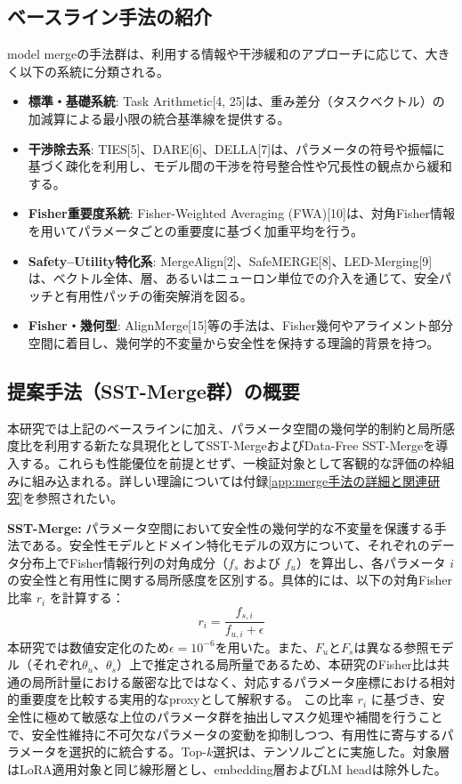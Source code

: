 \documentclass{article}
\begin{document}
\subsection{ベースライン手法の紹介}
model mergeの手法群は、利用する情報や干渉緩和のアプローチに応じて、大きく以下の系統に分類される。

\begin{itemize}
    \item \textbf{標準・基礎系統}: Task Arithmetic[4, 25]は、重み差分（タスクベクトル）の加減算による最小限の統合基準線を提供する。
    \item \textbf{干渉除去系}: TIES[5]、DARE[6]、DELLA[7]は、パラメータの符号や振幅に基づく疎化を利用し、モデル間の干渉を符号整合性や冗長性の観点から緩和する。
    \item \textbf{Fisher重要度系統}: Fisher-Weighted Averaging (FWA)[10]は、対角Fisher情報を用いてパラメータごとの重要度に基づく加重平均を行う。
    \item \textbf{Safety--Utility特化系}: MergeAlign[2]、SafeMERGE[8]、LED-Merging[9]は、ベクトル全体、層、あるいはニューロン単位での介入を通じて、安全パッチと有用性パッチの衝突解消を図る。
    \item \textbf{Fisher・幾何型}: AlignMerge[15]等の手法は、Fisher幾何やアライメント部分空間に着目し、幾何学的不変量から安全性を保持する理論的背景を持つ。
\end{itemize}

\subsection{提案手法（SST-Merge群）の概要}
本研究では上記のベースラインに加え、パラメータ空間の幾何学的制約と局所感度比を利用する新たな具現化としてSST-MergeおよびData-Free SST-Mergeを導入する。これらも性能優位を前提とせず、一検証対象として客観的な評価の枠組みに組み込まれる。詳しい理論については付録\ref{app:merge手法の詳細と関連研究}を参照されたい。

\textbf{SST-Merge:}
パラメータ空間において安全性の幾何学的な不変量を保護する手法である。安全性モデルとドメイン特化モデルの双方について、それぞれのデータ分布上でFisher情報行列の対角成分（$f_s$ および $f_u$）を算出し、各パラメータ $i$ の安全性と有用性に関する局所感度を区別する。具体的には、以下の対角Fisher比率 $r_i$ を計算する：
\[ r_i = \frac{f_{s,i}}{f_{u,i} + \epsilon} \]
本研究では数値安定化のため\(\epsilon=10^{-6}\)を用いた。また、\(F_u\)と\(F_s\)は異なる参照モデル（それぞれ\(\theta_u\)、\(\theta_s\)）上で推定される局所量であるため、本研究のFisher比は共通の局所計量における厳密な比ではなく、対応するパラメータ座標における相対的重要度を比較する実用的なproxyとして解釈する。
この比率 $r_i$ に基づき、安全性に極めて敏感な上位のパラメータ群を抽出しマスク処理や補間を行うことで、安全性維持に不可欠なパラメータの変動を抑制しつつ、有用性に寄与するパラメータを選択的に統合する。Top-\(k\)選択は、テンソルごとに実施した。対象層はLoRA適用対象と同じ線形層とし、embedding層およびLM headは除外した。
\end{document}

